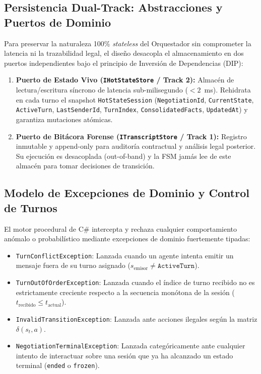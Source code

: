 \subsection{Persistencia Dual-Track: Abstracciones y Puertos de Dominio}
Para preservar la naturaleza 100\% \textit{stateless} del Orquestador sin comprometer la latencia ni la trazabilidad legal, el diseño desacopla el almacenamiento en dos puertos independientes bajo el principio de Inversión de Dependencias (DIP):

\begin{enumerate}
    \item \textbf{Puerto de Estado Vivo (\texttt{IHotStateStore} / Track 2):} Almacén de lectura/escritura síncrono de latencia sub-milisegundo ($<2$~ms). Rehidrata en cada turno el snapshot \texttt{HotStateSession} (\texttt{NegotiationId}, \texttt{CurrentState}, \texttt{ActiveTurn}, \texttt{LastSenderId}, \texttt{TurnIndex}, \texttt{ConsolidatedFacts}, \texttt{UpdatedAt}) y garantiza mutaciones atómicas.
    \item \textbf{Puerto de Bitácora Forense (\texttt{ITranscriptStore} / Track 1):} Registro inmutable y append-only para auditoría contractual y análisis legal posterior. Su ejecución es desacoplada (out-of-band) y la FSM jamás lee de este almacén para tomar decisiones de transición.
\end{enumerate}

\subsection{Modelo de Excepciones de Dominio y Control de Turnos}
El motor procedural de C\# intercepta y rechaza cualquier comportamiento anómalo o probabilístico mediante excepciones de dominio fuertemente tipadas:
\begin{itemize}
    \item \texttt{TurnConflictException}: Lanzada cuando un agente intenta emitir un mensaje fuera de su turno asignado ($s_{\text{emisor}} \neq \texttt{ActiveTurn}$).
    \item \texttt{TurnOutOfOrderException}: Lanzada cuando el índice de turno recibido no es estrictamente creciente respecto a la secuencia monótona de la sesión ($t_{\text{recibido}} \le t_{\text{actual}}$).
    \item \texttt{InvalidTransitionException}: Lanzada ante acciones ilegales según la matriz $\delta(s_t, a)$.
    \item \texttt{NegotiationTerminalException}: Lanzada categóricamente ante cualquier intento de interactuar sobre una sesión que ya ha alcanzado un estado terminal (\texttt{ended} o \texttt{frozen}).
\end{itemize}

